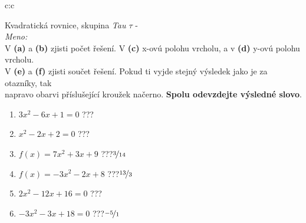 \documentclass[10pt]{report}
\begin{document}
\clearpage
\thispagestyle{empty}
\begin{tabular}{c:c}
\begin{minipage}[c][99mm][t]{0.49\linewidth}
\begin{center}
\vspace{7mm}
{\huge Kvadratická rovnice, skupina \textit{Tau $\tau$} -}\\[4.5mm]
\textit{Meno:}\phantom{xxxxxxxxxxxxxxxxxxxxxxxxxxxxxxxxxxxxxxxxxxxxxxxxxxxxxxxxxxxxxxxxx}\\[3.5mm]
V \textbf{(a)} a \textbf{(b)} zjisti počet řešení. V \textbf{(c)} x-ovú polohu vrcholu, a v \textbf{(d)} y-ovú polohu vrcholu.\\V \textbf{(e)} a \textbf{(f)} zjisti součet řešení. Pokud ti vyjde stejný výsledek jako je za otazníky, tak\\napravo obarvi příslušející kroužek načerno. \textbf{Spolu odevzdejte výsledné slovo}.\\[3mm]
\begin{minipage}{0.77\linewidth}
\begin{center}
\begin{varwidth}{\textwidth}
\begin{enumerate}
\large
\item $3x^2-6x+1=0$\quad \dotfill\; ???\;\dotfill {}
\item $x^2-2x+2=0$\quad \dotfill\; ???\;\dotfill {}
\item $f(x)=7x^2+3x+9$\quad \dotfill\; ???\;\dotfill \quad $\nicefrac{3}{14}$
\item $f(x)=-3x^2-2x+8$\quad \dotfill\; ???\;\dotfill \quad $\nicefrac{13}{3}$
\item $2x^2-12x+16=0$\quad \dotfill\; ???\;\dotfill {}
\item $-3x^2-3x+18=0$\quad \dotfill\; ???\;\dotfill \quad $\nicefrac{-5}{1}$
\end{enumerate}
\end{varwidth}
\end{center}
\end{minipage}

\end{center}
\end{minipage}
\end{tabular}
\end{document}
